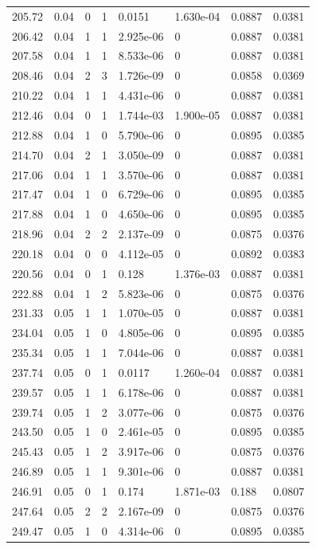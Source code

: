 \documentclass[preview]{standalone}
\begin{document}
{{{\begin{tabular}{L{1.2cm}C{1.2cm} C{0.3cm}C{0.5cm} C{1.4cm}C{1.4cm} C{1.4cm}C{1.4cm}}
  205.72  &  0.04  & 0     &  1 &  0.0151  & 1.630e-04  & 0.0887 &  0.0381   \\ 
  206.42  &  0.04  & 1     &  1 &  2.925e-06  & 0  & 0.0887 &  0.0381   \\ 
  207.58  &  0.04  & 1     &  1 &  8.533e-06  & 0  & 0.0887 &  0.0381   \\ 
  208.46  &  0.04  & 2     &  3 &  1.726e-09  & 0  & 0.0858 &  0.0369   \\ 
  210.22  &  0.04  & 1     &  1 &  4.431e-06  & 0  & 0.0887 &  0.0381   \\ 
  212.46  &  0.04  & 0     &  1 &  1.744e-03  & 1.900e-05  & 0.0887 &  0.0381   \\ 
  212.88  &  0.04  & 1     &  0 &  5.790e-06  & 0  & 0.0895 &  0.0385   \\ 
  214.70  &  0.04  & 2     &  1 &  3.050e-09  & 0  & 0.0887 &  0.0381   \\ 
  217.06  &  0.04  & 1     &  1 &  3.570e-06  & 0  & 0.0887 &  0.0381   \\ 
  217.47  &  0.04  & 1     &  0 &  6.729e-06  & 0  & 0.0895 &  0.0385   \\ 
  217.88  &  0.04  & 1     &  0 &  4.650e-06  & 0  & 0.0895 &  0.0385   \\ 
  218.96  &  0.04  & 2     &  2 &  2.137e-09  & 0  & 0.0875 &  0.0376   \\ 
  220.18  &  0.04  & 0     &  0 &  4.112e-05  & 0  & 0.0892 &  0.0383   \\ 
  220.56  &  0.04  & 0     &  1 &  0.128  & 1.376e-03  & 0.0887 &  0.0381   \\ 
  222.88  &  0.04  & 1     &  2 &  5.823e-06  & 0  & 0.0875 &  0.0376   \\ 
  231.33  &  0.05  & 1     &  1 &  1.070e-05  & 0  & 0.0887 &  0.0381   \\ 
  234.04  &  0.05  & 1     &  0 &  4.805e-06  & 0  & 0.0895 &  0.0385   \\ 
  235.34  &  0.05  & 1     &  1 &  7.044e-06  & 0  & 0.0887 &  0.0381   \\ 
  237.74  &  0.05  & 0     &  1 &  0.0117  & 1.260e-04  & 0.0887 &  0.0381   \\ 
  239.57  &  0.05  & 1     &  1 &  6.178e-06  & 0  & 0.0887 &  0.0381   \\ 
  239.74  &  0.05  & 1     &  2 &  3.077e-06  & 0  & 0.0875 &  0.0376   \\ 
  243.50  &  0.05  & 1     &  0 &  2.461e-05  & 0  & 0.0895 &  0.0385   \\ 
  245.43  &  0.05  & 1     &  2 &  3.917e-06  & 0  & 0.0875 &  0.0376   \\ 
  246.89  &  0.05  & 1     &  1 &  9.301e-06  & 0  & 0.0887 &  0.0381   \\ 
  246.91  &  0.05  & 0     &  1 &  0.174  & 1.871e-03  & 0.188 &  0.0807   \\ 
  247.64  &  0.05  & 2     &  2 &  2.167e-09  & 0  & 0.0875 &  0.0376   \\ 
  249.47  &  0.05  & 1     &  0 &  4.314e-06  & 0  & 0.0895 &  0.0385   \\ 
\hline 
\end{tabular} 

}}}
\end{document}
